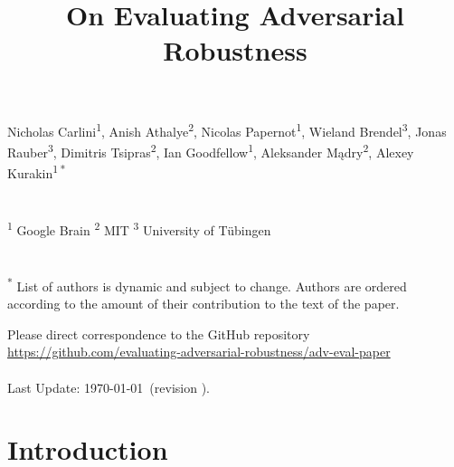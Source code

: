\documentclass{article} %
\begin{document}
\title{\vspace{5em}On Evaluating Adversarial Robustness}
\thispagestyle{empty}
\maketitle

  Nicholas Carlini\textsuperscript{1},
  Anish Athalye\textsuperscript{2},
  Nicolas Papernot\textsuperscript{1},
  Wieland Brendel\textsuperscript{3},
  Jonas Rauber\textsuperscript{3},
  Dimitris Tsipras\textsuperscript{2},
  Ian Goodfellow\textsuperscript{1},
  Aleksander M\k{a}dry\textsuperscript{2},
  Alexey Kurakin\textsuperscript{1}\,\textsuperscript{*}
  \\
  \noindent \\
  \noindent \\
  \textsuperscript{1} Google Brain
  \textsuperscript{2} MIT 
  \textsuperscript{3} University of T\"ubingen
  \\
  \noindent \\
  \noindent \\
  \textsuperscript{*} List of authors is dynamic and subject to change.
  Authors are ordered according to the amount of their contribution
  to the text of the paper.


\vspace{20em}
Please direct correspondence to the GitHub repository \\
\url{https://github.com/evaluating-adversarial-robustness/adv-eval-paper} \\
\noindent \\
Last Update: \today\ (revision \texttt{\version}).
\newpage

\reversemarginpar

  \vspace{-1em}
\begin{abstract}
    
\end{abstract}


\section{Introduction}
\end{document}
